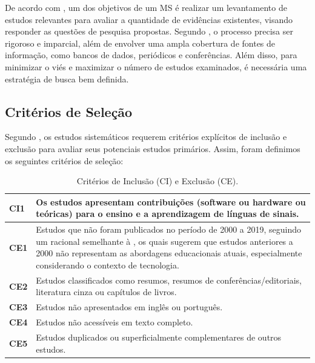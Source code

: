 De acordo com  , um dos objetivos de um MS é realizar um levantamento de estudos relevantes para avaliar a quantidade de evidências existentes, visando responder as questões de pesquisa propostas. Segundo , o processo precisa ser rigoroso e imparcial, além de envolver uma ampla cobertura de fontes de informação, como bancos de dados, periódicos e conferências. Além disso, para minimizar o viés e maximizar o número de estudos examinados, é necessária uma estratégia de busca bem definida. %

\subsection{Critérios de Seleção}
\label{ms:conducao-busca}

Segundo , os estudos sistemáticos requerem critérios explícitos de inclusão e exclusão para avaliar seus potenciais estudos primários. Assim, foram definimos os seguintes critérios de seleção:

\begin{table}[htbp]
\caption{Critérios de Inclusão (CI) e Exclusão (CE).}
\label{tab:ms:criterios-selecao}
\begin{tabularx}{\textwidth}{C{1cm}|X} \hline
\textbf{CI1} & Os estudos apresentam contribuições (software ou hardware ou teóricas) para o ensino e a aprendizagem de línguas de sinais. \\ \hline
\textbf{CE1} & Estudos que não foram publicados no período de 2000 a 2019, seguindo um racional semelhante à , os quais sugerem que estudos anteriores a 2000 não representam as abordagens educacionais atuais, especialmente considerando o contexto de tecnologia. \\ \hline
\textbf{CE2} & Estudos classificados como resumos, resumos de conferências/editoriais, literatura cinza ou capítulos de livros. \\ \hline
\textbf{CE3} & Estudos não apresentados em inglês ou português. \\ \hline
\textbf{CE4} & Estudos não acessíveis em texto completo. \\ \hline
\textbf{CE5} & Estudos duplicados ou superficialmente complementares de outros estudos. \\ \hline
\end{tabularx}
\fautor
\end{table}

